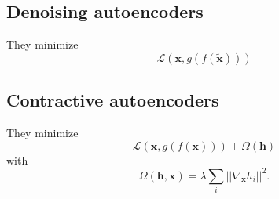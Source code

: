 \documentclass[a4paper,9pt]{extarticle}
\begin{document}
\begin{multicols*}{2}
		\subsection{Denoising autoencoders}
		They minimize
		\begin{equation*}
			\mathcal{L}(\mathbf{x},g(f(\widetilde{\mathbf{x}})))
		\end{equation*}
		\subsection{Contractive autoencoders}
		They minimize
		\begin{equation*}
				\mathcal{L}(\mathbf{x},g(f(\mathbf{x})))+\Omega(\mathbf{h})
		\end{equation*}
		with
		\begin{equation*}
			\Omega(\mathbf{h,x})=\lambda\sum_{i}||\nabla_{\mathbf{x}}h_{i}||^{2}.
		\end{equation*}

\end{multicols*}
\end{document}
